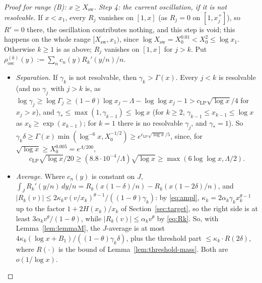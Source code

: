 \begin{proof}[Proof for range \textup{(B)}: $x\ge X_{\mathrm{sw}}$]
\emph{Step 4: the current oscillation, if it is not resolvable.} If $x<x_1$, every $R_j$ vanishes on $[1,x]$ (as $R_j=0$ on
$[1,x_j^+]$), so $R'=0$ there, the oscillation contributes nothing, and this step is void; this happens on the whole range
$[X_{\mathrm{sw}},x_1)$, since $\log X_{\mathrm{sw}}=X_0^{0.01}<X_0^2\le\log x_1$. Otherwise $k\ge1$ is as above; $R_j$ vanishes on
$[1,x]$ for $j>k$. Put $\rho^{(k)}_{\mathrm{osc}}(y):=\sum_nc_n(y)R_k'(y/n)/n$.
\begin{itemize}
\item \emph{Separation.} If $\gamma_k$ is not resolvable, then $\gamma_k>\Gamma(x)$. Every $j<k$ is resolvable (and no $\gamma_j$ with $j>k$ is, as
  $\log\gamma_j\ge\log\Gamma_j\ge(1-\theta)\log x_j-\Lambda-\log\log x_j-1>c_{\mathrm{LP}}\sqrt{\log x}/4$ for $x_j>x$), and
  $\gamma_*\le\max(1,\gamma_{k-1})\le\log x$ (for $k\ge2$, $\gamma_{k-1}\le x_{k-1}\le\log x$ as $x_k\ge\exp(x_{k-1})$; for $k=1$ there is
  no resolvable $\gamma_j$, and $\gamma_*=1$). So
  $\gamma_k\delta\ge\Gamma(x)\min(\log^{-6}x,X_0^{-1/2})\ge e^{c_{\mathrm{LP}}\sqrt{\log x}/5}$, since, for
  $\sqrt{\log x}\ge X_0^{0.005}=e^{\Lambda/200}$,
  \[
    c_{\mathrm{LP}}\sqrt{\log x}/20\ge(8.8\cdot10^{-4}/\Lambda)\sqrt{\log x}\ge\max(6\log\log x,\Lambda/2).
  \]
\item \emph{Average.} Where $c_n(y)$ is constant on $J$, $\int_JR_k'(y/n)\,dy/n=R_k(x(1-\delta)/n)-R_k(x(1-2\delta)/n)$, and
  $|R_k(v)|\le2\kappa_kv(v/x_k)^{\theta-1}/((1-\theta)\gamma_k)$: by \eqref{eq:ampl}, $\kappa_k=2\alpha_k\gamma_kx_k^{\theta-1}$ up to the
  factor $1+2H(x_k)/x_k$ of Section~\ref{sec:target}, so the right side is at least $3\alpha_kv^\theta/(1-\theta)$, while
  $|R_k(v)|\le\alpha_kv^\theta$ by \eqref{eq:Rk}. So, with
  Lemma~\ref{lem:lemmaM}, the $J$-average is at most $4\kappa_k(\log x+B_1)/((1-\theta)\gamma_k\delta)$, plus the threshold
  part $\le\kappa_k\cdot R(2\delta)$, where $R(\cdot)$ is the bound of Lemma~\ref{lem:threshold-mass}. Both are $o(1/\log x)$.

\end{itemize}
\end{proof}
